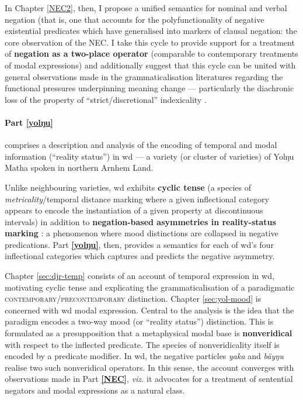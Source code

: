 \documentclass[11pt,dvipsnames]{report}
\begin{document}
In Chapter \ref{NEC2}, then, I propose a unified semantics for nominal and verbal negation (that is, one that accounts for the polyfunctionality of negative existential predicates which have generalised into markers of clausal negation: the core observation of the \acrshort{NEC}.
I take this cycle to provide support for a treatment of \textbf{negation as a two-place operator} (comparable to contemporary treatments of modal expressions) and additionally suggest that this cycle can be united with general observations made in the grammaticalisation literatures regarding the functional pressures underpinning meaning change --- particularly the diachronic loss of the property of ``strict/discretional'' indexicality \citep[see][]{Perry2012}.
 
 
\paragraph{Part \ref{yolŋu}} comprises a description and analysis of the encoding of temporal and modal information (``reality status'') in \acrfull{wd} --- a variety (or cluster of varieties) of Yolŋu Matha spoken in northern Arnhem Land.

Unlike neighbouring varieties, \gls{wd} exhibits \textbf{cyclic tense} (a species of \textit{metricality}\slash temporal distance marking where a given inflectional category appears to encode the instantiation of a given property at discontinuous intervals) in addition to \textbf{negation-based asymmetries in reality-status marking} \citep[\textit{cf.}][]{Miestamo2005}: a phenomenon where mood distinctions are collapsed in negative predications. Part \textbf{\ref{yolŋu}}, then, provides a semantics for each of \acrshort{wd}'s four inflectional categories which captures and predicts the negative asymmetry. 


Chapter \ref{sec:djr-temp} consists of an account of temporal expression in \acrshort{wd}, motivating cyclic tense and explicating the grammaticalisation of a paradigmatic \textsc{contemporary\slash pre\-con\-temporary} distinction. Chapter \ref{sec:yol-mood} is concerned with \acrshort{wd} modal expression. Central to the analysis is the idea that the paradigm encodes a two-way mood (or ``reality status'') distinction. This is formulated as a presupposition that a metaphysical modal base is \textbf{nonveridical} with respect to the inflected predicate. The species of nonveridicality itself is encoded by a predicate modifier. In \gls{wd}, the negative particles \textit{yaka} and \textit{bäyŋu} realise two such nonveridical operators. In this sense, the account converges with observations made in Part \textbf{\ref{NEC}}, \textit{viz.} it advocates for a treatment of sentential negators and modal expressions as a natural class.
\end{document}
